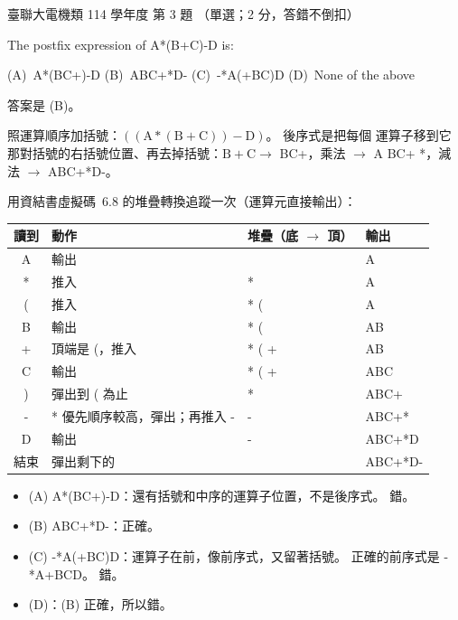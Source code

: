\begin{pastexam}[label={px:ust-114-ee-ds-03}]{臺聯大電機類 114 學年度 第 3 題}
（單選；2 分，答錯不倒扣）

The postfix expression of A*(B+C)-D is:

(A)~A*(BC+)-D \qquad (B)~ABC+*D- \qquad (C)~-*A(+BC)D \qquad (D)~None of the above
\end{pastexam}

\begin{pastsoln}
答案是 (B)。

照運算順序加括號：$((\mathrm{A} * (\mathrm{B} + \mathrm{C})) - \mathrm{D})$。 後序式是把每個
運算子移到它那對括號的右括號位置、再去掉括號：$\mathrm{B} + \mathrm{C} \to$ BC+，乘法
$\to$ A BC+ *，減法 $\to$ ABC+*D-。

用資結書虛擬碼~6.8 的堆疊轉換追蹤一次（運算元直接輸出）：
\begin{center}
\small
\begin{tabular}{clll}
\toprule
讀到 & 動作 & 堆疊（底 $\to$ 頂） & 輸出 \\
\midrule
A & 輸出 & & A \\
* & 推入 & * & A \\
( & 推入 & * ( & A \\
B & 輸出 & * ( & AB \\
+ & 頂端是 (，推入 & * ( + & AB \\
C & 輸出 & * ( + & ABC \\
) & 彈出到 ( 為止 & * & ABC+ \\
- & * 優先順序較高，彈出；再推入 - & - & ABC+* \\
D & 輸出 & - & ABC+*D \\
結束 & 彈出剩下的 & & ABC+*D- \\
\bottomrule
\end{tabular}
\end{center}
\begin{itemize}
\item (A) A*(BC+)-D：還有括號和中序的運算子位置，不是後序式。 錯。
\item (B) ABC+*D-：正確。
\item (C) -*A(+BC)D：運算子在前，像前序式，又留著括號。 正確的前序式是 -*A+BCD。 錯。
\item (D)：(B) 正確，所以錯。
\end{itemize}
\end{pastsoln}
